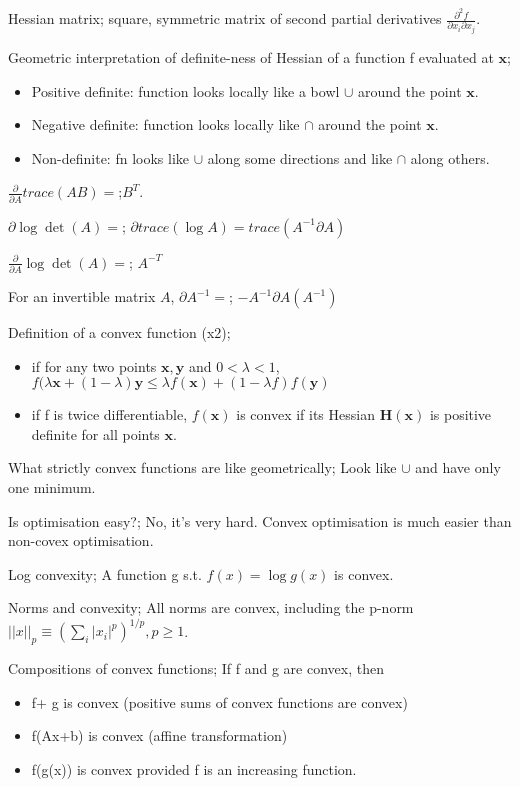 \documentclass{article}
\begin{document}
Hessian matrix; square, symmetric matrix of second partial derivatives $\frac{\partial^2 f}{\partial x_i \partial x_j}$.

Geometric interpretation of definite-ness of Hessian of a function f evaluated at $\mathbf{x}$; \begin{itemize} \item Positive definite: function looks locally like a bowl $\cup$ around the point $\mathbf{x}$. \item Negative definite: function looks locally like $\cap$ around the point $\mathbf{x}$. \item Non-definite: fn looks like $\cup$ along some directions and like $\cap$ along others. \end{itemize} 

$\frac{\partial}{\partial A}trace(AB) =$;$B^T$.

$\partial \log \det (A) =$; $\partial trace(\log A) = trace(A^{-1}\partial A)$

$\frac{\partial}{\partial A}\log\det(A)=$; $A^{-T}$

For an invertible matrix $A$, $\partial A^{-1}=$; $-A^{-1}\partial A (A^{-1})$

Definition of a convex function (x2); \begin{itemize} \item if for any two points $\mathbf{x, y}$ and $0<\lambda < 1$, $f(\lambda\mathbf{x}+(1-\lambda)\mathbf{y}\leq \lambda f(\mathbf{x})+(1-\lambda f)f(\mathbf{y})$ \item if f is twice  differentiable, $f(\mathbf{x})$ is convex if its Hessian $\mathbf{H(x)}$ is positive definite for all points $\mathbf{x}$. \end{itemize}

What strictly convex functions are like geometrically; Look like $\cup$ and have only one minimum.

Is optimisation easy?; No, it's very hard. Convex optimisation is much easier than non-covex optimisation.

Log convexity; A function g s.t. $f(x)=\log g(x)$ is convex.

Norms and convexity; All norms are convex, including the p-norm $||x||_p \equiv (\sum_i |x_i|^p)^{1/p}, p\geq 1$.

Compositions of convex functions; If f and g are convex, then \begin{itemize} \item f+ g is convex (positive sums of convex functions are convex) \item f(Ax+b) is convex (affine transformation) \item f(g(x)) is convex provided f is an increasing function. \end{itemize}
\end{document}
